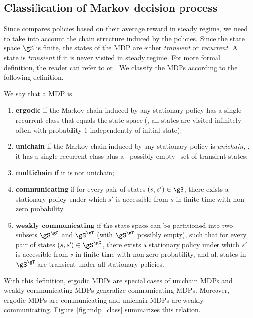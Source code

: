 \subsection{Classification of Markov decision process}
Since  compares policies based on their average reward in steady regime, we need to take into account the chain structure induced by the policies.
Since the state space $\gS$ is finite, the states of the MDP are either \emph{transient} or \emph{recurrent}.
A state is \emph{transient} if it is never visited in steady regime.
For more formal definition, the reader can refer to \cite[Appendix~A]{puterman2014markov} or \cite{levin2017markov}.
We classify the MDPs according to the following definition.
\begin{defn}
    \label{ch:mdp:defn:mdp_class}
    We say that a MDP is
    \begin{enumerate}[label=(\roman*)]
        \item \textbf{ergodic} if the Markov chain induced by any stationary policy has a single recurrent class that equals the state space (\ie, all states are visited infinitely often with probability $1$ independently of initial state);
        \item \label{it:unichain} \textbf{unichain} if the Markov chain induced by any stationary policy is \emph{unichain}, \ie, it has a single recurrent class plus a --possibly empty-- set of transient states;
        \item \textbf{multichain} if it is not unichain;
        \item \textbf{communicating} if for every pair of states $(s,s')\in\gS$, there exists a stationary policy under which $s'$ is accessible from $s$ in finite time with non-zero probability
        \item \textbf{weakly communicating} if the state space can be partitioned into two subsets $\gS^{\gC}$ and $\gS^{\gT}$ (with $\gS^{\gT}$ possibly empty), such that for every pair of states $(s,s')\in\gS^{\gC}$, there exists a stationary policy under which $s'$ is accessible from $s$ in finite time with non-zero probability, and all states in $\gS^{\gT}$ are transient under all stationary policies.
    \end{enumerate}
\end{defn}
With this definition, ergodic MDPs are special cases of unichain MDPs and weakly communicating MDPs generalize communicating MDPs. 
Moreover, ergodic MDPs are communicating and unichain MDPs are weakly communicating.
Figure~\ref{fig:mdp_class} summarizes this relation.

